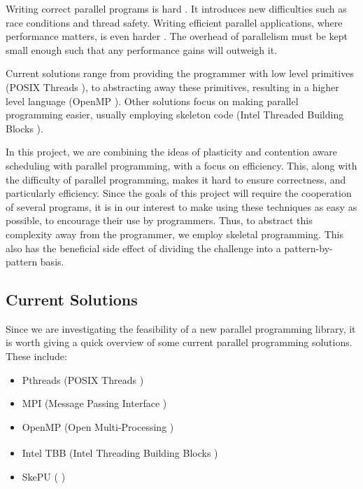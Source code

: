 Writing correct parallel programs is hard \cite{parallel_hard}. It introduces new difficulties such as race conditions and thread safety. Writing efficient parallel applications, where performance matters, is even harder \cite{parallel_hard_perf}. The overhead of parallelism must be kept small enough such that any performance gains will outweigh it. 

Current solutions range from providing the programmer with low level primitives (POSIX Threads \cite{posix_threads}), to abstracting away these primitives, resulting in a higher level language (OpenMP \cite{openmp}). Other solutions focus on making parallel programming easier, usually employing skeleton code (Intel Threaded Building Blocks \cite{threading_building_blocks_2018}).

In this project, we are combining the ideas of plasticity and contention aware scheduling with parallel programming, with a focus on efficiency. This, along with the difficulty of parallel programming, makes it hard to ensure correctness, and particularly efficiency. Since the goals of this project will require the cooperation of several programs, it is in our interest to make using these techniques as easy as possible, to encourage their use by programmers. Thus, to abstract this complexity away from the programmer, we employ skeletal programming. This also has the beneficial side effect of dividing the challenge into a pattern-by-pattern basis. 



\subsection{Current Solutions}
\label{section:background:current_solutions}

Since we are investigating the feasibility of a new parallel programming library, it is worth giving a quick overview of some current parallel programming solutions. These include:

\begin{itemize}
	\item Pthreads (POSIX Threads \cite{posix_threads})
	\item MPI 	   (Message Passing Interface \cite{mpi})
	\item OpenMP   (Open Multi-Processing \cite{openmp_home} \cite{openmp})
	\item Intel\textsuperscript{\textregistered} TBB (Intel Threading Building Blocks \cite{threading_building_blocks_2018} \cite{contreras_martonosi_2008})
	\item SkePU (\cite{skepu} \cite{skepu_2_2018})
\end{itemize}


